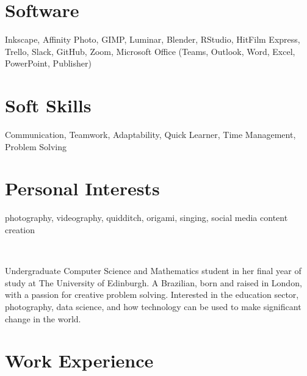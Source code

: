 \documentclass[]{cv-style}          %
\begin{document}
\begin{aside}
\section{Software}
Inkscape, Affinity Photo, GIMP, Luminar, Blender, RStudio, HitFilm Express, Trello, Slack, GitHub, Zoom, Microsoft Office (Teams, Outlook, Word, Excel, PowerPoint, Publisher)
~
%
\section{Soft Skills}
Communication, Teamwork, Adaptability, Quick Learner, Time Management, Problem Solving
~
%
\section{Personal Interests}
photography, videography, quidditch, origami, singing, social media content creation
~
%
\end{aside}
~
\begin{tcolorbox}[colback=darkpurple!5!white,colframe=darkpurple!75!black]
Undergraduate Computer Science and Mathematics student in her final year of study at The University of Edinburgh. A Brazilian, born and raised in London, with a passion for creative problem solving. Interested in the education sector, photography, data science, and how technology can be used to make significant change in the world.
\end{tcolorbox}



\section{Work Experience}
\end{document}
